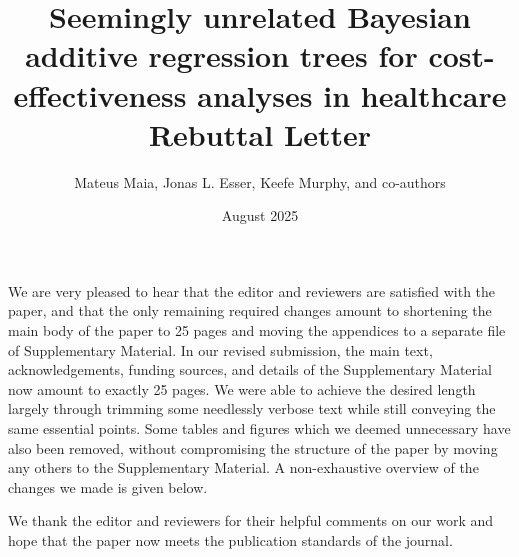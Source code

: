 \documentclass{article}
\title{\vspace{-2em}Seemingly unrelated Bayesian additive regression trees for cost-effectiveness analyses in healthcare\\\medskip\Large{Rebuttal Letter}}
\author{Mateus Maia, Jonas L. Esser, Keefe Murphy, and co-authors}
\date{August 2025\vspace{-1em}}
\begin{document}
\maketitle

We are very pleased to hear that the editor and reviewers are satisfied with the paper, and that the only remaining required changes amount to shortening the main body of the paper to 25 pages and moving the appendices to a separate file of Supplementary Material. In our revised submission, the main text, acknowledgements, funding sources, and details of the Supplementary Material now amount to exactly 25 pages. We were able to achieve the desired length largely through trimming some needlessly verbose text while still conveying the same essential points. Some tables and figures which we deemed unnecessary have also been removed, without compromising the structure of the paper by moving any others to the Supplementary Material. A non-exhaustive overview of the changes we made is given below.

We thank the editor and reviewers for their helpful comments on our work and hope that the paper now meets the publication standards of the journal.
\end{document}
